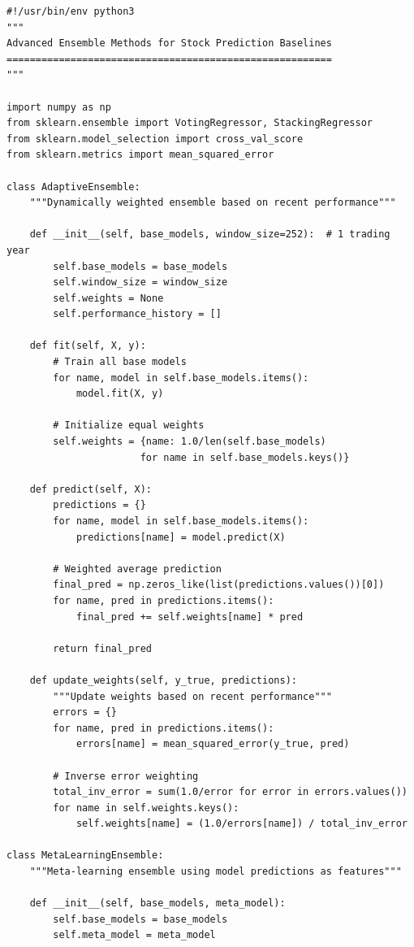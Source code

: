 \documentclass[11pt]{article}
\begin{document}
\begin{lstlisting}[style=pythonstyle, caption=Ensemble Baseline Methods]
#!/usr/bin/env python3
"""
Advanced Ensemble Methods for Stock Prediction Baselines
========================================================
"""

import numpy as np
from sklearn.ensemble import VotingRegressor, StackingRegressor
from sklearn.model_selection import cross_val_score
from sklearn.metrics import mean_squared_error

class AdaptiveEnsemble:
    """Dynamically weighted ensemble based on recent performance"""
    
    def __init__(self, base_models, window_size=252):  # 1 trading year
        self.base_models = base_models
        self.window_size = window_size
        self.weights = None
        self.performance_history = []
        
    def fit(self, X, y):
        # Train all base models
        for name, model in self.base_models.items():
            model.fit(X, y)
            
        # Initialize equal weights
        self.weights = {name: 1.0/len(self.base_models) 
                       for name in self.base_models.keys()}
                       
    def predict(self, X):
        predictions = {}
        for name, model in self.base_models.items():
            predictions[name] = model.predict(X)
            
        # Weighted average prediction
        final_pred = np.zeros_like(list(predictions.values())[0])
        for name, pred in predictions.items():
            final_pred += self.weights[name] * pred
            
        return final_pred
        
    def update_weights(self, y_true, predictions):
        """Update weights based on recent performance"""
        errors = {}
        for name, pred in predictions.items():
            errors[name] = mean_squared_error(y_true, pred)
            
        # Inverse error weighting
        total_inv_error = sum(1.0/error for error in errors.values())
        for name in self.weights.keys():
            self.weights[name] = (1.0/errors[name]) / total_inv_error

class MetaLearningEnsemble:
    """Meta-learning ensemble using model predictions as features"""
    
    def __init__(self, base_models, meta_model):
        self.base_models = base_models
        self.meta_model = meta_model
        

\end{lstlisting}
\end{document}
